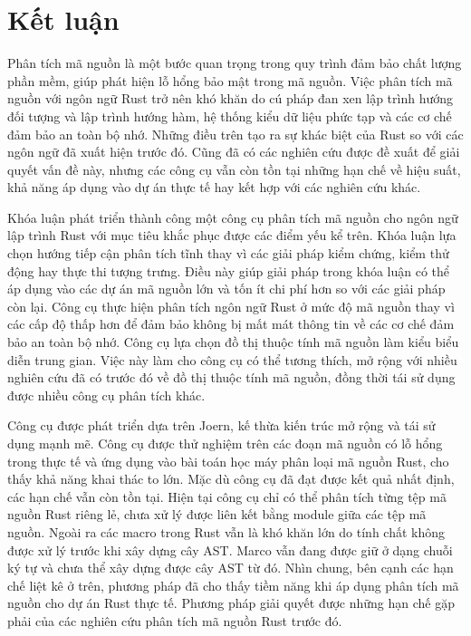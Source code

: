 \chapter*{Kết luận}

Phân tích mã nguồn là một bước quan trọng trong quy trình đảm bảo chất lượng phần mềm, giúp phát hiện lỗ hổng bảo mật trong mã nguồn.
Việc phân tích mã nguồn với ngôn ngữ Rust trở nên khó khăn do cú pháp đan xen lập trình hướng đối tượng và lập trình hướng hàm, hệ thống kiểu dữ liệu phức tạp và các cơ chế đảm bảo an toàn bộ nhớ.
Những điều trên tạo ra sự khác biệt của Rust so với các ngôn ngữ đã xuất hiện trước đó.
Cũng đã có các nghiên cứu được đề xuất để giải quyết vấn đề này, nhưng các công cụ vẫn còn tồn tại những hạn chế về hiệu suất, khả năng áp dụng vào dự án thực tế hay kết hợp với các nghiên cứu khác.

Khóa luận phát triển thành công một công cụ phân tích mã nguồn cho ngôn ngữ lập trình Rust với mục tiêu khắc phục được các điểm yếu kể trên.
Khóa luận lựa chọn hướng tiếp cận phân tích tĩnh thay vì các giải pháp kiểm chứng, kiểm thử động hay thực thi tượng trưng.
Điều này giúp giải pháp trong khóa luận có thể áp dụng vào các dự án mã nguồn lớn và tốn ít chi phí hơn so với các giải pháp còn lại.
Công cụ thực hiện phân tích ngôn ngữ Rust ở mức độ mã nguồn thay vì các cấp độ thấp hơn để đảm bảo không bị mất mát thông tin về các cơ chế đảm bảo an toàn bộ nhớ.
Công cụ lựa chọn đồ thị thuộc tính mã nguồn làm kiểu biểu diễn trung gian.
Việc này làm cho công cụ có thể tương thích, mở rộng với nhiều nghiên cứu đã có trước đó về đồ thị thuộc tính mã nguồn, đồng thời tái sử dụng được nhiều công cụ phân tích khác.

Công cụ được phát triển dựa trên Joern, kế thừa kiến trúc mở rộng và tái sử dụng mạnh mẽ.
Công cụ được thử nghiệm trên các đoạn mã nguồn có lỗ hổng trong thực tế và ứng dụng vào bài toán học máy phân loại mã nguồn Rust, cho thấy khả năng khai thác to lớn.
Mặc dù công cụ đã đạt được kết quả nhất định, các hạn chế vẫn còn tồn tại.
Hiện tại công cụ chỉ có thể phân tích từng tệp mã nguồn Rust riêng lẻ, chưa xử lý được liên kết bằng module giữa các tệp mã nguồn.
Ngoài ra các macro trong Rust vẫn là khó khăn lớn do tính chất không được xử lý trước khi xây dựng cây AST.
Marco vẫn đang được giữ ở dạng chuỗi ký tự và chưa thể xây dựng được cây AST từ đó.
Nhìn chung, bên cạnh các hạn chế liệt kê ở trên, phương pháp đã cho thấy tiềm năng khi áp dụng phân tích mã nguồn cho dự án Rust thực tế.
Phương pháp giải quyết được những hạn chế gặp phải của các nghiên cứu phân tích mã nguồn Rust trước đó.
